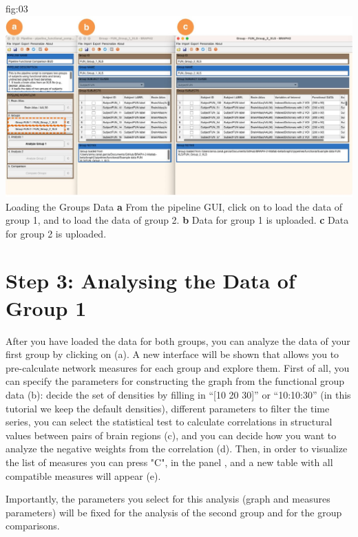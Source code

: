 \documentclass[justified]{tufte-handout}
\begin{document}
	{fig:03}
	{
	\includegraphics{fig03.jpg}
	}
	{Loading the Groups Data}
	{
	{\bf a} From the pipeline GUI, click on  to load the data of group 1, and  to load the data of group 2.
	{\bf b} Data for group 1 is uploaded. {\bf c} Data for group 2 is uploaded.
	}

\section{Step 3: Analysing the Data of Group 1}
 
After you have loaded the data for both groups, you can analyze the data of your first group by clicking on  (a). A new interface will be shown that allows you to pre-calculate network measures for each group and explore them. First of all, you can specify the parameters for constructing the graph from the functional group data (b): decide the set of densities by filling in “[10 20 30]” or “10:10:30” (in this tutorial we keep the default densities), different parameters to filter the time series, you can select the statistical test to calculate correlations in structural values between pairs of brain regions (c), and you can decide how you want to analyze the negative weights from the correlation (d). Then, in order to visualize the list of measures you can press "C", in the panel , and a new table with all compatible measures will appear (e). 

Importantly, the parameters you select for this analysis (graph and measures parameters) will be fixed for the analysis of the second group and for the group comparisons.
\end{document}
